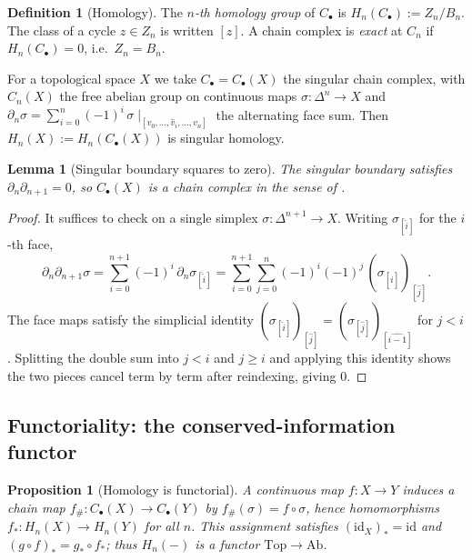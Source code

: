 \documentclass[12pt]{article}
\newtheorem{proposition}[proposition]{Proposition}
\newtheorem{lemma}[lemma]{Lemma}
\theoremstyle{definition}
\newtheorem{definition}[definition]{Definition}
\theoremstyle{remark}
\newcommand{\Top}{\mathrm{Top}}
\newcommand{\Ab}{\mathrm{Ab}}
\newcommand{\id}{\mathrm{id}}
\begin{document}
\begin{definition}[Homology]
\label{def:homology}
The \emph{$n$-th homology group} of $C_\bullet$ is $H_n(C_\bullet):=Z_n/B_n$. The
class of a cycle $z\in Z_n$ is written $[z]$. A chain complex is \emph{exact} at
$C_n$ if $H_n(C_\bullet)=0$, i.e.\ $Z_n=B_n$.
\end{definition}

For a topological space $X$ we take $C_\bullet=C_\bullet(X)$ the singular chain
complex, with $C_n(X)$ the free abelian group on continuous maps
$\sigma\colon\Delta^n\to X$ and $\partial_n\sigma=\sum_{i=0}^n(-1)^i\,\sigma\!\mid_{[v_0,\dots,\hat v_i,\dots,v_n]}$
the alternating face sum. Then $H_n(X):=H_n(C_\bullet(X))$ is singular homology.

\begin{lemma}[Singular boundary squares to zero]
\label{lem:sing-d2}
The singular boundary satisfies $\partial_n\partial_{n+1}=0$, so $C_\bullet(X)$ is
a chain complex in the sense of .
\end{lemma}

\begin{proof}
It suffices to check on a single simplex $\sigma\colon\Delta^{n+1}\to X$. Writing
$\sigma_{[\hat i]}$ for the $i$-th face,
\[
  \partial_n\partial_{n+1}\sigma
  = \sum_{i=0}^{n+1}(-1)^i\,\partial_n\sigma_{[\hat i]}
  = \sum_{i=0}^{n+1}\sum_{j=0}^{n}(-1)^i(-1)^j\,(\sigma_{[\hat i]})_{[\hat j]} .
\]
The face maps satisfy the simplicial identity $(\sigma_{[\hat i]})_{[\hat j]}
=(\sigma_{[\hat j]})_{[\widehat{i-1}]}$ for $j<i$. Splitting the double sum into
$j<i$ and $j\ge i$ and applying this identity shows the two pieces cancel term by
term after reindexing, giving $0$.
\end{proof}

\subsection{Functoriality: the conserved-information functor}

\begin{proposition}[Homology is functorial]
\label{prop:H-functor}
A continuous map $f\colon X\to Y$ induces a chain map $f_\#\colon C_\bullet(X)\to
C_\bullet(Y)$ by $f_\#(\sigma)=f\circ\sigma$, hence homomorphisms
$f_*\colon H_n(X)\to H_n(Y)$ for all $n$. This assignment satisfies
$(\id_X)_*=\id$ and $(g\circ f)_*=g_*\circ f_*$; thus $H_n(-)$ is a functor
$\Top\to\Ab$.
\end{proposition}
\end{document}
